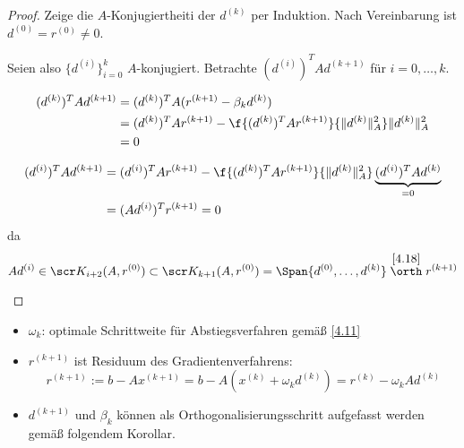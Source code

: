 \documentclass[11pt]{scrartcl}
\begin{document}
\begin{st}
\begin{proof}
		Zeige die $A$-Konjugiertheiti der $d^{(k)}$ per Induktion.
		Nach Vereinbarung ist $d^{(0)} = r^{(0)} \neq 0$.

		Seien also $\{d^{(i)}\}_{i=0}^k$ $A$-konjugiert.
		Betrachte $(d^{(i)})^T A d^{(k+1)}$ für $i=0,\dotsc, k$.
		\begin{seg}[$i=k$]
			\begin{align*}
				(d^{(k)})^T A d^{(k+1)} 
				&= (d^{(k)})^T A (r^{(k+1)} - \beta_k d^{(k)}) \\
				&= (d^{(k)})^T A r^{(k+1)} - \f {(d^{(k)})^T A r^{(k+1)}}{\|d^{(k)}\|_A^2} \|d^{(k)}\|_A^2 \\
				&= 0
			\end{align*}
		\end{seg}
		\begin{seg}[$i<k$]
			\begin{align*}
				(d^{(i)})^T A d^{(k+1)}
				&= (d^{(i)})^T A r^{(k+1)} - \f {(d^{(k)})^T A r^{(k+1)}}{\|d^{(k)}\|_A^2} \underbrace{(d^{(i)})^T A d^{(k)}}_{=0} \\
				&= (Ad^{(i)})^T r^{(k+1)} = 0
			\end{align*}
			da 
			\[
				Ad^{(i)} \in \scr K_{i+2}(A, r^{(0)})
				\subset \scr K_{k+1} (A, r^{(0)})
				= \Span\{d^{(0)}, \dotsc, d^{(k)}\} \stackrel{\ref{4.18}}\orth r^{(k+1)}
			\]
		\end{seg}
	\end{proof}
	\begin{note}
		\begin{itemize}
			\item
				$\omega_k$: optimale Schrittweite für Abstiegsverfahren gemäß \ref{4.11}
			\item
				$r^{(k+1)}$ ist Residuum des Gradientenverfahrens:
				\[
					r^{(k+1)} := b - Ax^{(k+1)}
					= b - A(x^{(k)} + \omega_k d^{(k)})
					= r^{(k)} - \omega_k A d^{(k)}
				\]
			\item
				$d^{(k+1)}$ und $\beta_k$ können als Orthogonalisierungsschritt aufgefasst werden gemäß folgendem Korollar.
		\end{itemize}
	\end{note}
\end{st}
\end{document}
